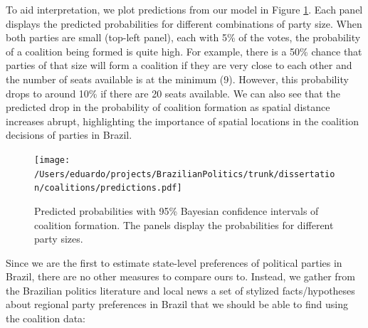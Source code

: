 To aid interpretation, we plot predictions from our model in Figure \ref{fig:strucpred}. Each panel displays the predicted probabilities for different combinations of party size. When both parties are small (top-left panel), each with 5\% of the votes, the probability of a coalition being formed is quite high. For example, there is a 50\% chance that parties of that size  will form a coalition if they are very close to each other and the number of seats available is at the minimum (9). However, this probability drops to around 10\% if there are 20 seats available. We can also see that the predicted drop in the probability of coalition formation as spatial distance increases  abrupt, highlighting the importance of spatial locations in the coalition decisions of parties in Brazil.

\begin{figure}
  \centering
  \texttt{[image: /Users/eduardo/projects/BrazilianPolitics/trunk/dissertation/coalitions/predictions.pdf]} 
  \caption{Predicted probabilities with 95\% Bayesian confidence intervals of coalition formation. The panels display the probabilities for different party sizes.  }
  \label{fig:strucpred}
\end{figure}

Since we are  the first to estimate state-level preferences of political parties in Brazil,  there are no other measures to compare ours to. Instead, we gather from the Brazilian politics literature and local news a set of  stylized facts/hypotheses about regional party preferences in Brazil that we should be able to find using the coalition data:


